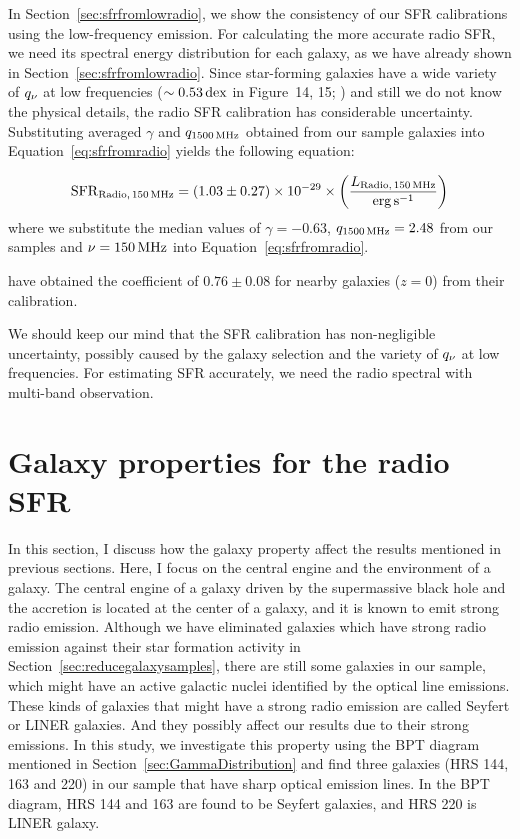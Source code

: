 In Section~\ref{sec:sfrfromlowradio}, we show the consistency of our SFR calibrations using the low-frequency emission.
For calculating the more accurate radio SFR, we need its spectral energy distribution for each galaxy, as we have already shown in Section~\ref{sec:sfrfromlowradio}.
Since star-forming galaxies have a wide variety of $q_{\nu}$ at low frequencies ($\sim 0.53\,\mathrm{dex}$ in Figure~14, 15; \citealt{CalistroRivera2017a}) and still we do not know the physical details, the radio SFR calibration has considerable uncertainty.
Substituting averaged $\gamma$ and $q_{\mathrm{1500\,\mathrm{MHz}}}$ obtained from our sample galaxies into Equation~\ref{eq:sfrfromradio} yields the following equation:

\begin{equation}\label{eq:sfrradio_calibration}
    \mathrm{SFR}_{\mathrm{Radio},\,150\,\mathrm{MHz}} = \left(1.03\pm0.27\right) \times 10^{-29} \times \left(\frac{L_{\mathrm{Radio},\,150\,\mathrm{MHz}}}{\mathrm{erg}\,\mathrm{s}^{-1}}\right)
\end{equation}
where we substitute the median values of $\gamma=-0.63$, $q_{\mathrm{1500\,\mathrm{MHz}}}=2.48$ from our samples and $\nu=150\,\mathrm{MHz}$ into Equation~\ref{eq:sfrfromradio}.

\citet{CalistroRivera2017a} have obtained the coefficient of $0.76 \pm 0.08$ for nearby galaxies ($z = 0$) from their calibration.

We should keep our mind that the SFR calibration has non-negligible uncertainty, possibly caused by the galaxy selection and the variety of $q_{\nu}$ at low frequencies.
For estimating SFR accurately, we need the radio spectral with multi-band observation.



\section{Galaxy properties for the radio SFR}\label{sec:galaxypropertiesfortheradiosfr}

In this section, I discuss how the galaxy property affect the results mentioned in previous sections.
Here, I focus on the central engine and the environment of a galaxy.
The central engine of a galaxy driven by the supermassive black hole and the accretion is located at the center of a galaxy, and it is known to emit strong radio emission.
Although we have eliminated galaxies which have strong radio emission against their star formation activity in Section~\ref{sec:reducegalaxysamples}, there are still some galaxies in our sample, which might have an active galactic nuclei identified by the optical line emissions.
These kinds of galaxies that might have a strong radio emission are called Seyfert or LINER galaxies.
And they possibly affect our results due to their strong emissions.
In this study, we investigate this property using the BPT diagram mentioned in Section~\ref{sec:GammaDistribution} and find three galaxies (HRS 144, 163 and 220) in our sample that have sharp optical emission lines.
In the BPT diagram, HRS 144 and 163 are found to be Seyfert galaxies, and HRS 220 is LINER galaxy.

